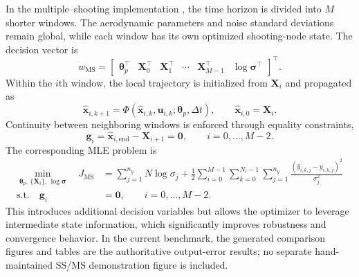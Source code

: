 \documentclass[11pt]{article}
\begin{document}
In the multiple--shooting implementation \cite{bock1984multiple,jategaonkar2006flight}, the time horizon is divided into $M$
shorter windows. The aerodynamic parameters and noise standard deviations remain
global, while each window has its own optimized shooting-node state. The decision
vector is
\[
    w_{\mathrm{MS}}
    =
    \begin{bmatrix}
        \boldsymbol{\theta}_p^\top &
        \mathbf{X}_0^\top &
        \mathbf{X}_1^\top &
        \cdots &
        \mathbf{X}_{M-1}^\top &
        \log\boldsymbol{\sigma}^\top
    \end{bmatrix}^{\!\top}.
\]
Within the $i$th window, the local trajectory is initialized from $\mathbf{X}_i$
and propagated as
\[
    \hat{\mathbf{x}}_{i,k+1}
    =
    \Phi(\hat{\mathbf{x}}_{i,k},\mathbf{u}_{i,k};
    \boldsymbol{\theta}_p,\Delta t),
    \qquad
    \hat{\mathbf{x}}_{i,0}=\mathbf{X}_i.
\]
Continuity between neighboring windows is enforced through equality constraints,
\[
    \mathbf{g}_i
    =
    \hat{\mathbf{x}}_{i,\mathrm{end}}
    -
    \mathbf{X}_{i+1}
    =
    \mathbf{0},
    \qquad i=0,\ldots,M-2.
\]
The corresponding MLE problem is
\[
\begin{aligned}
    \min_{\boldsymbol{\theta}_p,\,\{\mathbf{X}_i\},\,\log\boldsymbol{\sigma}}
    \quad
    J_{\mathrm{MS}}
    &=
    \sum_{j=1}^{n_y} N\log\sigma_j
    +
    \frac{1}{2}
    \sum_{i=0}^{M-1}
    \sum_{k=0}^{N_i-1}
    \sum_{j=1}^{n_y}
    \frac{
    \left(\hat{y}_{i,k,j}-y_{i,k,j}\right)^2
    }{\sigma_j^2} \\
    \text{s.t.}\quad
    \mathbf{g}_i &= \mathbf{0},
    \qquad i=0,\ldots,M-2.
\end{aligned}
\]
This introduces additional decision variables but allows the optimizer to leverage intermediate state information, which significantly improves robustness and convergence behavior. In the current benchmark, the generated comparison figures and tables are the authoritative output-error results; no separate hand-maintained SS/MS demonstration figure is included.
\end{document}
